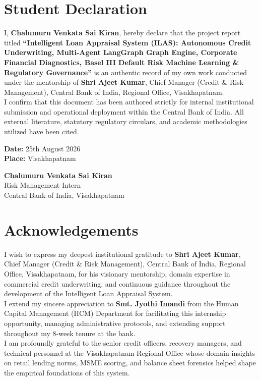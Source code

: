 \documentclass[11pt,a4paper,oneside]{report}
\begin{document}
\chapter*{Student Declaration}
I, \textbf{Chalumuru Venkata Sai Kiran}, hereby declare that the project report titled \textbf{``Intelligent Loan Appraisal System (ILAS): Autonomous Credit Underwriting, Multi-Agent LangGraph Graph Engine, Corporate Financial Diagnostics, Basel III Default Risk Machine Learning \& Regulatory Governance''} is an authentic record of my own work conducted under the mentorship of \textbf{Shri Ajeet Kumar}, Chief Manager (Credit \& Risk Management), Central Bank of India, Regional Office, Visakhapatnam.\\[0.4cm]
I confirm that this document has been authored strictly for internal institutional submission and operational deployment within the Central Bank of India. All external literature, statutory regulatory circulars, and academic methodologies utilized have been cited.\\[1cm]
\noindent
\begin{minipage}{0.5\textwidth}
    \textbf{Date:} 25th August 2026\\
    \textbf{Place:} Visakhapatnam
\end{minipage}
\hfill
\begin{minipage}{0.45\textwidth}
    \begin{flushright}
        \textbf{Chalumuru Venkata Sai Kiran}\\
        Risk Management Intern\\
        Central Bank of India, Visakhapatnam
    \end{flushright}
\end{minipage}

\newpage
\chapter*{Acknowledgements}
I wish to express my deepest institutional gratitude to \textbf{Shri Ajeet Kumar}, Chief Manager (Credit \& Risk Management), Central Bank of India, Regional Office, Visakhapatnam, for his visionary mentorship, domain expertise in commercial credit underwriting, and continuous guidance throughout the development of the Intelligent Loan Appraisal System.\\[0.4cm]
I extend my sincere appreciation to \textbf{Smt. Jyothi Imandi} from the Human Capital Management (HCM) Department for facilitating this internship opportunity, managing administrative protocols, and extending support throughout my 8-week tenure at the bank.\\[0.4cm]
I am profoundly grateful to the senior credit officers, recovery managers, and technical personnel at the Visakhapatnam Regional Office whose domain insights on retail lending norms, MSME scoring, and balance sheet forensics helped shape the empirical foundations of this system.
\end{document}
